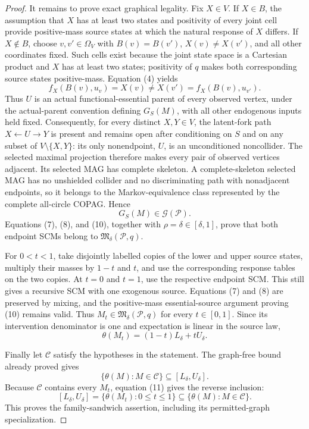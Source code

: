 \documentclass{article}
\begin{document}
\begin{proof}
It remains to prove exact graphical legality.  Fix \(X\in V\).  If \(X\in B\), the assumption that \(X\) has at least two states and positivity of every joint cell provide positive-mass source states at which the natural response of \(X\) differs.  If \(X\notin B\), choose \(v,v'\in\Omega_V\) with \(B(v)=B(v')\), \(X(v)\neq X(v')\), and all other coordinates fixed.  Such cells exist because the joint state space is a Cartesian product and \(X\) has at least two states; positivity of \(q\) makes both corresponding source states positive-mass.  Equation (4) yields
\[
f_X(B(v),u_v)=X(v)\neq X(v')=f_X(B(v),u_{v'}).
\]
Thus \(U\) is an actual functional-essential parent of every observed vertex, under the actual-parent convention defining \(G_S(M)\), with all other endogenous inputs held fixed.  Consequently, for every distinct \(X,Y\in V\), the latent-fork path \(X\leftarrow U\to Y\) is present and remains open after conditioning on \(S\) and on any subset of \(V\setminus\{X,Y\}\): its only nonendpoint, \(U\), is an unconditioned noncollider.  The selected maximal projection therefore makes every pair of observed vertices adjacent.  Its selected MAG has complete skeleton.  A complete-skeleton selected MAG has no unshielded collider and no discriminating path with nonadjacent endpoints, so it belongs to the Markov-equivalence class represented by the complete all-circle COPAG.  Hence
\[
G_S(M)\in\mathcal G(\mathcal P). \tag{10}
\]
Equations (7), (8), and (10), together with \(\rho=\delta\in[\delta,1]\), prove that both endpoint SCMs belong to \(\mathfrak M_\delta(\mathcal P,q)\).

For \(0<t<1\), take disjointly labelled copies of the lower and upper source states, multiply their masses by \(1-t\) and \(t\), and use the corresponding response tables on the two copies.  At \(t=0\) and \(t=1\), use the respective endpoint SCM.  This still gives a recursive SCM with one exogenous source.  Equations (7) and (8) are preserved by mixing, and the positive-mass essential-source argument proving (10) remains valid.  Thus \(M_t\in\mathfrak M_\delta(\mathcal P,q)\) for every \(t\in[0,1]\).  Since its intervention denominator is one and expectation is linear in the source law,
\[
\theta(M_t)=(1-t)L_\delta+tU_\delta. \tag{11}
\]

Finally let \(\mathscr C\) satisfy the hypotheses in the statement.  The graph-free bound already proved gives
\[
\{\theta(M):M\in\mathscr C\}\subseteq[L_\delta,U_\delta].
\]
Because \(\mathscr C\) contains every \(M_t\), equation (11) gives the reverse inclusion:
\[
[L_\delta,U_\delta]
=\{\theta(M_t):0\leq t\leq1\}
\subseteq\{\theta(M):M\in\mathscr C\}.
\]
This proves the family-sandwich assertion, including its permitted-graph specialization.
\end{proof}
\end{document}
